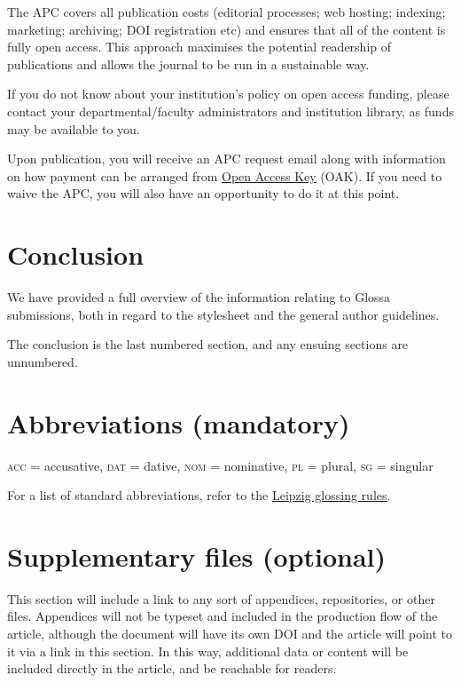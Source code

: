 \documentclass[charis,linguex,biblatex]{glossa}
\begin{document}
The APC covers all publication costs (editorial processes; web hosting; indexing; marketing; archiving; DOI registration etc) and ensures that all of the content is fully open access. This approach maximises the potential readership of publications and allows the journal to be run in a sustainable way.

If you do not know about your institution’s policy on open access funding, please contact your departmental/faculty administrators and institution library, as funds may be available to you.

Upon publication, you will receive an APC request email along with information on how payment can be arranged from \href{https://www.openaccesskey.com}{Open Access Key} (OAK). If you need to waive the APC, you will also have an opportunity to do it at this point.

\section{Conclusion}

We have provided a full overview of the information relating to Glossa submissions, both in regard to the stylesheet and the general author guidelines. 

The conclusion is the last numbered section, and any ensuing sections are unnumbered.

\section*{Abbreviations (mandatory)}

\textsc{acc} = accusative, \textsc{dat} = dative, \textsc{nom} = nominative, \textsc{pl} = plural, \textsc{sg} = singular

For a list of standard abbreviations, refer to the \href{https://www.eva.mpg.de/lingua/resources/glossing-rules.php}{Leipzig glossing rules}. 

\section*{Supplementary files (optional)}

This section will include a link to any sort of appendices, repositories, or other files. Appendices will not be typeset and included in the production flow of the article, although the document will have its own DOI and the article will point to it via a link in this section. In this way, additional data or content will be included directly in the article, and  be reachable for readers.
\end{document}
